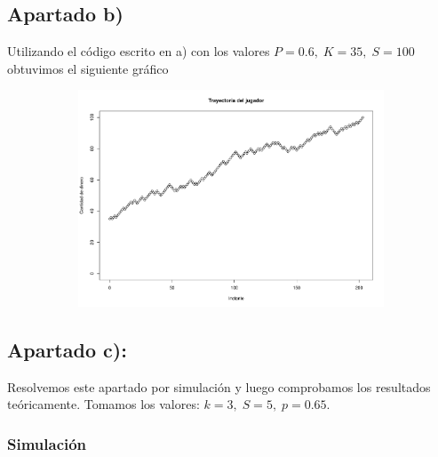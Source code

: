 \documentclass[11pt]{article}
\begin{document}

\subsection*{Apartado b)}

Utilizando el código escrito en a) con los valores $P = 0.6, \; K = 35, \; S = 100$ obtuvimos el
siguiente gráfico

\begin{figure}[h!]
  \begin{center}
    \begin{subfigure}[b]{0.9\linewidth}
      \includegraphics[width=\linewidth]{trayectoriaGamblers.pdf}
    \end{subfigure}
  \end{center}
\end{figure}


\subsection*{Apartado c):}

Resolvemos este apartado por simulación y luego comprobamos los resultados teóricamente.
Tomamos los valores: $ k = 3, \; S = 5,\; p = 0.65 $.

\subsubsection*{Simulación}
\end{document}
